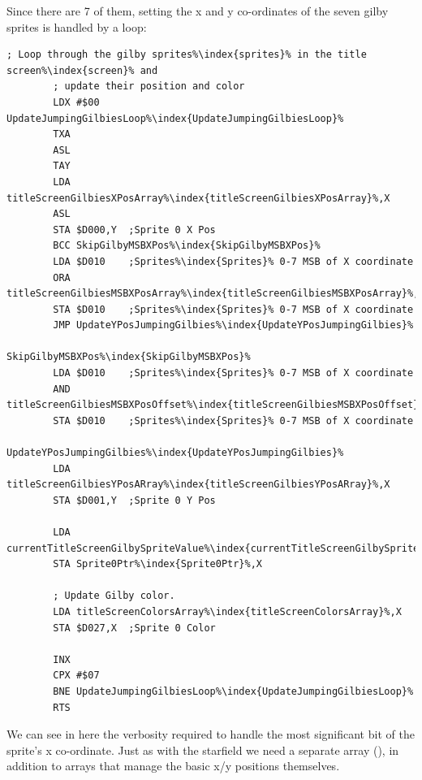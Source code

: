 Since there are 7 of them, setting the x and y co-ordinates of the seven gilby sprites is handled by a loop:

\begin{lstlisting}[caption= The loop in \icode{UpdateJumpingGilbyPositionsAndColors\index{UpdateJumpingGilbyPositionsAndColors}} updating the x and y position on screen\index{screen} and color of each of the gilby sprites\index{sprites}.,escapechar=\%]
        ; Loop through the gilby sprites%\index{sprites}% in the title screen%\index{screen}% and
        ; update their position and color
        LDX #$00
UpdateJumpingGilbiesLoop%\index{UpdateJumpingGilbiesLoop}%   
        TXA
        ASL
        TAY
        LDA titleScreenGilbiesXPosArray%\index{titleScreenGilbiesXPosArray}%,X
        ASL
        STA $D000,Y  ;Sprite 0 X Pos
        BCC SkipGilbyMSBXPos%\index{SkipGilbyMSBXPos}%
        LDA $D010    ;Sprites%\index{Sprites}% 0-7 MSB of X coordinate
        ORA titleScreenGilbiesMSBXPosArray%\index{titleScreenGilbiesMSBXPosArray}%,X
        STA $D010    ;Sprites%\index{Sprites}% 0-7 MSB of X coordinate
        JMP UpdateYPosJumpingGilbies%\index{UpdateYPosJumpingGilbies}%

SkipGilbyMSBXPos%\index{SkipGilbyMSBXPos}%   
        LDA $D010    ;Sprites%\index{Sprites}% 0-7 MSB of X coordinate
        AND titleScreenGilbiesMSBXPosOffset%\index{titleScreenGilbiesMSBXPosOffset}%,X
        STA $D010    ;Sprites%\index{Sprites}% 0-7 MSB of X coordinate

UpdateYPosJumpingGilbies%\index{UpdateYPosJumpingGilbies}%
        LDA titleScreenGilbiesYPosARray%\index{titleScreenGilbiesYPosARray}%,X
        STA $D001,Y  ;Sprite 0 Y Pos

        LDA currentTitleScreenGilbySpriteValue%\index{currentTitleScreenGilbySpriteValue}%
        STA Sprite0Ptr%\index{Sprite0Ptr}%,X

        ; Update Gilby color.
        LDA titleScreenColorsArray%\index{titleScreenColorsArray}%,X
        STA $D027,X  ;Sprite 0 Color

        INX
        CPX #$07
        BNE UpdateJumpingGilbiesLoop%\index{UpdateJumpingGilbiesLoop}%
        RTS
\end{lstlisting}
We can see in here the verbosity required to handle the most significant bit of the sprite's x co-ordinate. Just
as with the starfield we need a separate array (), in addition
to arrays that manage the basic x/y positions themselves.


